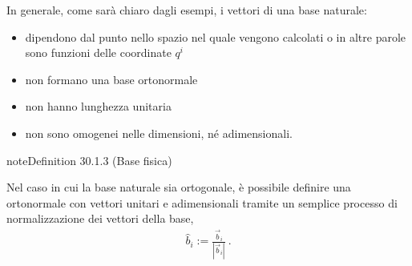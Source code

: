 \documentclass[letterpaper,10pt,italian]{jupyterBook}
\begin{document}
\sphinxAtStartPar
In generale, come sarà chiaro dagli esempi, i vettori di una base naturale:
\begin{itemize}
\item {} 
\sphinxAtStartPar
dipendono dal punto nello spazio nel quale vengono calcolati \sphinxhyphen{} o in altre parole sono funzioni delle coordinate \(q^i\)

\item {} 
\sphinxAtStartPar
non formano una base orto\sphinxhyphen{}normale

\item {} 
\sphinxAtStartPar
non hanno lunghezza unitaria

\item {} 
\sphinxAtStartPar
non sono omogenei nelle dimensioni, né adimensionali.

\end{itemize}
\label{ch/vector-calculus/geometry:def-physical-base}
\begin{sphinxadmonition}{note}{Definition 30.1.3 (Base fisica)}



\sphinxAtStartPar
Nel caso in cui la base naturale sia ortogonale, è possibile definire una  \sphinxhyphen{} orto\sphinxhyphen{}normale con vettori unitari e adimensionali \sphinxhyphen{} tramite un semplice processo di normalizzazione dei vettori della base,
\begin{equation*}
\begin{split}\hat{b}_i := \frac{\vec{b}_i}{|\vec{b}_i|} \ .\end{split}
\end{equation*}\end{sphinxadmonition}
\end{document}
